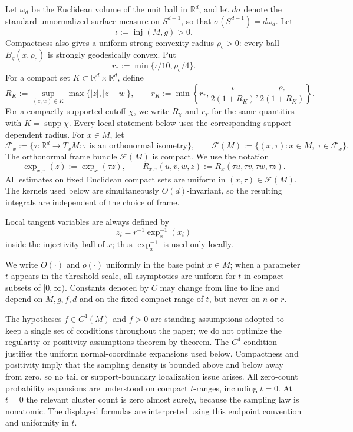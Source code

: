 \documentclass[11pt]{article}
\theoremstyle{remark}
\newcommand{\R}{\mathbb R}
\newcommand{\inj}{\operatorname{inj}}
\numberwithin{equation}{section}
\begin{document}
Let $\omega_d$ be the Euclidean volume of the unit ball in $\R^d$, and let
$d\sigma$ denote the standard unnormalized surface measure on $S^{d-1}$, so that
$\sigma(S^{d-1})=d\omega_d$.
Let
\[
\iota:=\inj(M,g)>0.
\]
Compactness also gives a uniform strong-convexity radius $\rho_{\mathrm c}>0$:
every ball $B_g(x,\rho_{\mathrm c})$ is strongly geodesically convex.  Put
\[
r_*:=\min\{\iota/10,\rho_{\mathrm c}/4\}.
\]
For a compact set $K\subset\mathbb R^d\times\mathbb R^d$, define
\[
R_K:=\sup_{(z,w)\in K}\max\{|z|,|z-w|\},\qquad
r_K:=\min\left\{r_*,\frac{\iota}{2(1+R_K)},
\frac{\rho_{\mathrm c}}{2(1+R_K)}\right\}.
\]
For a compactly supported cutoff $\chi$, we write $R_\chi$ and $r_\chi$
for the same quantities with $K=\operatorname{supp}\chi$.  Every local
statement below uses the corresponding support-dependent radius.  For
$x\in M$, let
\[
\mathcal F_x:=\{\tau:\mathbb R^d\to T_xM:\tau\text{ is an orthonormal
isometry}\},
\qquad
\mathcal F(M):=\{(x,\tau):x\in M,\ \tau\in\mathcal F_x\}.
\]
The orthonormal frame bundle $\mathcal F(M)$ is compact.  We use the notation
\[
\exp_{x,\tau}(z):=\exp_x(\tau z),
\qquad
R_{x,\tau}(u,v,w,z):=R_x(\tau u,\tau v,\tau w,\tau z).
\]
All estimates on fixed Euclidean compact sets are uniform in
$(x,\tau)\in\mathcal F(M)$.  The kernels used below are simultaneously
$O(d)$-invariant, so the resulting integrals are independent of the choice
of frame.

Local tangent variables are always defined by
\[
z_i=r^{-1}\exp_x^{-1}(x_i)
\]
inside the injectivity ball of $x$; thus $\exp_x^{-1}$ is used only locally.

We write $O(\cdot)$ and $o(\cdot)$ uniformly in the base point $x\in M$;
when a parameter $t$ appears in the threshold scale, all asymptotics are uniform
for $t$ in compact subsets of $[0,\infty)$.  Constants denoted by $C$ may change
from line to line and depend on $M,g,f,d$ and on the fixed compact range of $t$,
but never on $n$ or $r$.

The hypotheses $f\in C^4(M)$ and $f>0$ are standing assumptions adopted to
keep a single set of conditions throughout the paper; we do not optimize the
regularity or positivity assumptions theorem by theorem.  The $C^4$ condition
justifies the uniform normal-coordinate expansions used below.  Compactness
and positivity imply that the sampling density is bounded above and below away
from zero, so no tail or support-boundary localization issue arises.
All zero-count probability expansions are understood on compact $t$-ranges,
including $t=0$.  At $t=0$ the relevant cluster count is zero almost surely,
because the sampling law is nonatomic.  The displayed formulas are interpreted
using this endpoint convention and uniformity in $t$.
\end{document}
